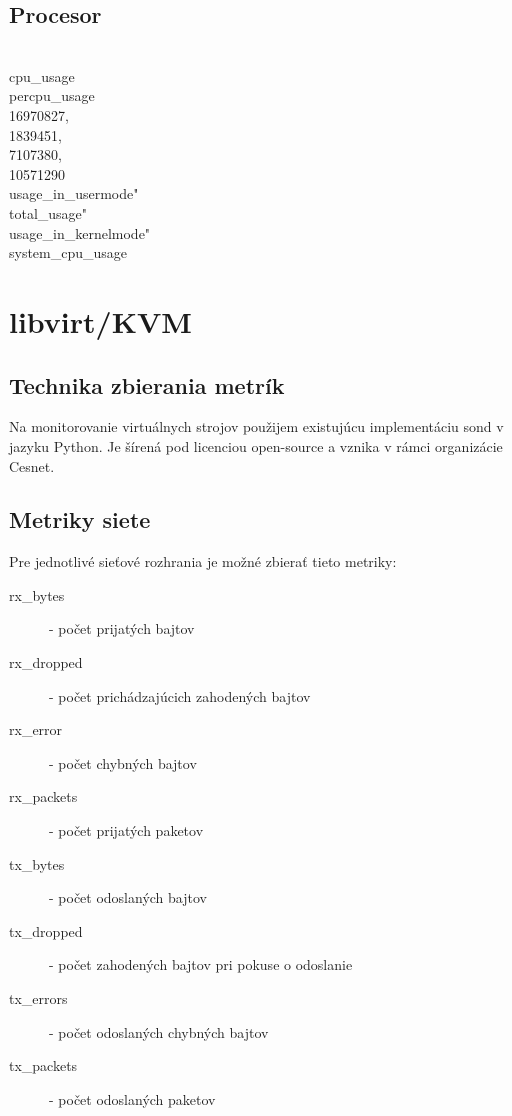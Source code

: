 \documentclass[11pt,final,oneside]{fithesis}
\begin{document}
\subsection{Procesor}
\\        cpu_usage 
\\           percpu_usage
\\              16970827,
\\              1839451,
\\              7107380,
\\              10571290
\\           usage_in_usermode"
\\           total_usage" 
\\           usage_in_kernelmode" 
\\        system_cpu_usage

\section{libvirt/KVM}
\subsection{Technika zbierania metrík}
Na monitorovanie virtuálnych strojov použijem existujúcu implementáciu sond v jazyku Python. Je šírená pod licenciou open-source a vznika v rámci organizácie Cesnet. 

\subsection{Metriky siete}
Pre jednotlivé sieťové rozhrania je možné zbierať tieto metriky:
\begin{description}
\item[rx_bytes] - počet prijatých bajtov
\item[rx_dropped] - počet prichádzajúcich zahodených bajtov
\item[rx_error] - počet chybných bajtov
\item[rx_packets] - počet prijatých paketov
\item[tx_bytes] - počet odoslaných bajtov
\item[tx_dropped] - počet zahodených bajtov pri pokuse o odoslanie
\item[tx_errors] - počet odoslaných chybných bajtov
\item[tx_packets] - počet odoslaných paketov
\end{description}
\end{document}
